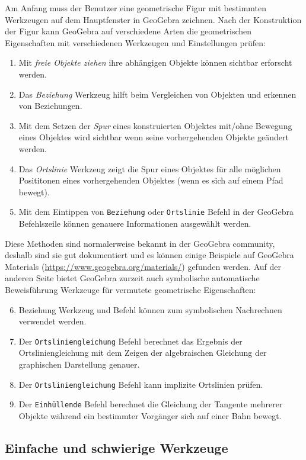 \documentclass{article}
\begin{document}
Am Anfang muss der Benutzer eine geometrische Figur mit bestimmten Werkzeugen auf dem Hauptfenster in GeoGebra zeichnen. Nach der Konstruktion der Figur kann GeoGebra auf verschiedene Arten die geometrischen Eigenschaften mit verschiedenen Werkzeugen und Einstellungen prüfen:
\begin{enumerate}
    \item Mit \textit{freie Objekte ziehen} ihre abhängigen Objekte können sichtbar erforscht werden.
    \item Das \textit{Beziehung} Werkzeug hilft beim Vergleichen von Objekten und erkennen von Beziehungen.
    \item Mit dem Setzen der  \textit{Spur} eines konstruierten Objektes mit/ohne Bewegung eines Objektes wird sichtbar wenn seine vorhergehenden Objekte geändert werden.
    \item Das \textit{Ortslinie} Werkzeug zeigt die Spur eines Objektes für alle möglichen Posititonen eines vorhergehenden Objektes (wenn es sich auf einem Pfad bewegt).
    \item Mit dem Eintippen von \texttt{Beziehung} oder \texttt{Ortslinie} Befehl in der GeoGebra Befehlszeile können genauere Informationen ausgewählt werden. 
\end{enumerate}
Diese Methoden sind normalerweise bekannt in der GeoGebra community, deshalb sind sie gut dokumentiert und es können einige Beispiele auf GeoGebra Materials (\url{https://www.geogebra.org/materials/}) gefunden werden. Auf der anderen Seite bietet GeoGebra zurzeit auch symbolische automatische Beweisführung Werkzeuge für vermutete geometrische Eigenschaften:
\begin{enumerate}
\setcounter{enumi}{5}
    \item Beziehung Werkzeug und Befehl können zum symbolischen Nachrechnen verwendet werden.
    \item Der \texttt{Ortsliniengleichung} Befehl berechnet das Ergebnis der Ortsliniengleichung mit dem Zeigen der algebraischen Gleichung der graphischen Darstellung genauer.
    \item Der \texttt{Ortsliniengleichung} Befehl kann implizite Ortslinien prüfen.
    \item Der \texttt{Einhüllende} Befehl berechnet die Gleichung der Tangente mehrerer Objekte während ein bestimmter Vorgänger sich auf einer Bahn bewegt.
\end{enumerate}

\subsection{Einfache und schwierige Werkzeuge}
\end{document}
